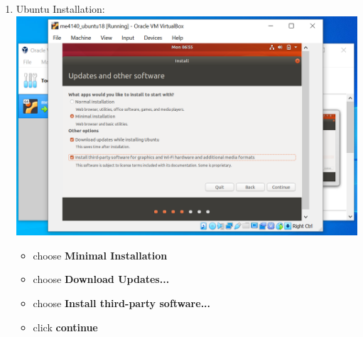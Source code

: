 \documentclass[12pt]{article}
\begin{document}
\begin{description}
\begin{description}
\begin{enumerate}[label=\alph*)]
\begin{itemize}
            \end{itemize}
\vspace{10mm}
\item Ubuntu Installation: \vspace{5mm} \\
      		\hspace*{-2.5cm}\includegraphics[scale=.6]{Capture15.png}\\
             \begin{itemize}
                    
                 \item choose {\bf Minimal Installation}
                 \item choose {\bf Download Updates...}           
                 \item choose {\bf Install third-party software...}  
                 \item click {\bf continue}     
            \end{itemize}


\end{enumerate}
\end{description}
\end{description}
\end{document}
